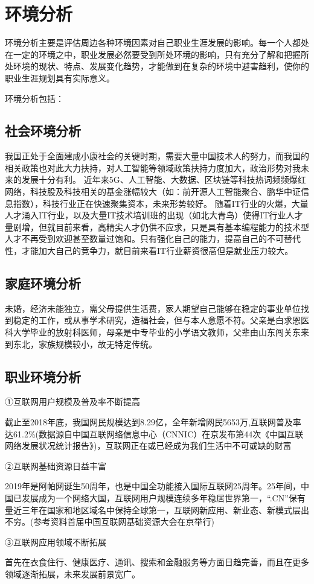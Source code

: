 \documentclass{article}
\begin{document}
\section{环境分析}
环境分析主要是评估周边各种环境因素对自己职业生涯发展的影响。每一个人都处在一定的环境之中，职业发展必然要受到所处环境的影响，只有充分了解和把握所处环境的现状、特点、发展变化趋势，才能做到在复杂的环境中避害趋利，使你的职业生涯规划具有实际意义。\par
环境分析包括：\par
\subsection{社会环境分析}
我国正处于全面建成小康社会的关键时期，需要大量中国技术人的努力，而我国的相关政策也对此大力扶持，对人工智能等领域政策扶持力度加大，政治形势对我未来的发展十分有利。
近年来5G、人工智能、大数据、区块链等科技热词频频爆红网络，科技股及科技相关的基金涨幅较大（如：前开源人工智能聚合、鹏华中证信息指数），科技行业正在快速聚集资本，未来形势较好。
随着IT行业的火爆，大量人才涌入IT行业，以及大量IT技术培训班的出现（如北大青鸟）使得IT行业人才量剧增，但就目前来看，高精尖人才仍供不应求，只是具有基本编程能力的技术型人才不再受到欢迎甚至数量过饱和。只有强化自己的能力，提高自己的不可替代性，才能加大自己的竞争力，就目前来看IT行业薪资很高但是就业压力较大。
\par
\subsection{家庭环境分析}
未婚，经济未能独立，需父母提供生活费，家人期望自己能够在稳定的事业单位找到稳定的工作，或从事学术研究，造福社会，但与本人意愿不符。父亲是白求恩医科大学毕业的放射科医师，母亲是中专毕业的小学语文教师，父辈由山东闯关东来到东北，家族规模较小，故无特定传统。\par
\subsection{职业环境分析}
①互联网用户规模及普及率不断提高\par
		截止至2018年底，我国网民规模达到8.29亿，全年新增网民5653万,互联网普及率达61.2\%(数据源自中国互联网络信息中心（CNNIC）在京发布第44次《中国互联网络发展状况统计报告》)，互联网正在或已经成为我们生活中不可或缺的财富\par
②互联网基础资源日益丰富\par
		2019年是阿帕网诞生50周年，也是中国全功能接入国际互联网25周年。25年间，中国已发展成为一个网络大国，互联网用户规模连续多年稳居世界第一，“.CN”保有量近三年在国家和地区域名中保持全球第一，互联网新应用、新业态、新模式层出不穷。(参考资料首届中国互联网基础资源大会在京举行)\par
③互联网应用领域不断拓展\par
		首先在衣食住行、健康医疗、通讯、搜索和金融服务等方面日趋完善，而且在更多领域逐渐拓展，未来发展前景宽广。\par
\end{document}
